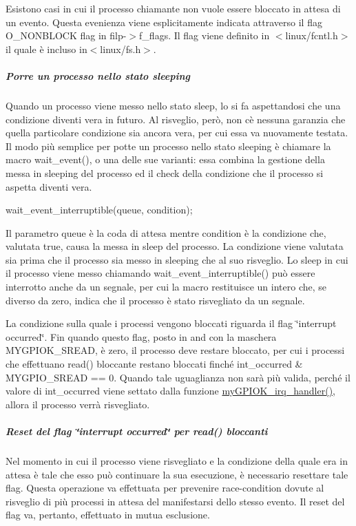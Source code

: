 Esistono casi in cui il processo chiamante non vuole essere bloccato in attesa di un evento. Questa evenienza viene esplicitamente indicata attraverso il flag O\+\_\+\+N\+O\+N\+B\+L\+O\+CK flag in filp-\/$>$f\+\_\+flags. Il flag viene definito in $<$linux/fcntl.\+h$>$ il quale è incluso in$<$linux/fs.\+h$>$.

\subparagraph*{Porre un processo nello stato sleeping}

Quando un processo viene messo nello stato sleep, lo si fa aspettandosi che una condizione diventi vera in futuro. Al risveglio, però, non c\textquotesingle{}è nessuna garanzia che quella particolare condizione sia ancora vera, per cui essa va nuovamente testata. Il modo più semplice per potte un processo nello stato sleeping è chiamare la macro wait\+\_\+event(), o una delle sue varianti\+: essa combina la gestione della messa in sleeping del processo ed il check della condizione che il processo si aspetta diventi vera. 
\begin{DoxyCode}
wait\_event\_interruptible(queue, condition);
\end{DoxyCode}
 Il parametro queue è la coda di attesa mentre condition è la condizione che, valutata true, causa la messa in sleep del processo. La condizione viene valutata sia prima che il processo sia messo in sleeping che al suo risveglio. Lo sleep in cui il processo viene messo chiamando wait\+\_\+event\+\_\+interruptible() può essere interrotto anche da un segnale, per cui la macro restituisce un intero che, se diverso da zero, indica che il processo è stato risvegliato da un segnale.

La condizione sulla quale i processi vengono bloccati riguarda il flag \char`\"{}interrupt occurred\char`\"{}. Fin quando questo flag, posto in and con la maschera M\+Y\+G\+P\+I\+O\+K\+\_\+\+S\+R\+E\+AD, è zero, il processo deve restare bloccato, per cui i processi che effettuano read() bloccante restano bloccati finché int\+\_\+occurred \& M\+Y\+G\+P\+I\+O\+\_\+\+S\+R\+E\+AD == 0. Quando tale uguaglianza non sarà più valida, perché il valore di int\+\_\+occurred viene settato dalla funzione \hyperlink{group___linux-_driver_ga2fc230a12a97aa63e43b2dc4aec73511}{my\+G\+P\+I\+O\+K\+\_\+irq\+\_\+handler()}, allora il processo verrà risvegliato.

\subparagraph*{Reset del flag \char`\"{}interrupt occurred\char`\"{} per read() bloccanti}

Nel momento in cui il processo viene risvegliato e la condizione della quale era in attesa è tale che esso può continuare la sua esecuzione, è necessario resettare tale flag. Questa operazione va effettuata per prevenire race-\/condition dovute al risveglio di più processi in attesa del manifestarsi dello stesso evento. Il reset del flag va, pertanto, effettuato in mutua esclusione.

